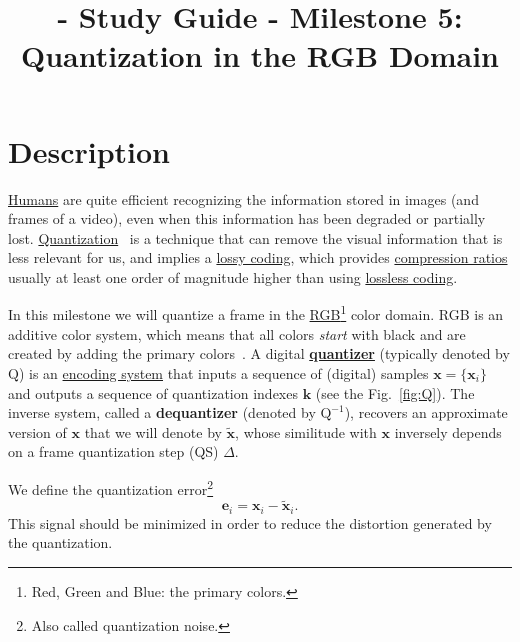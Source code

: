 
\title{\SM{} - Study Guide - Milestone 5: Quantization in the RGB Domain}

\maketitle

\tableofcontents

\section{Description}
\href{https://en.wikipedia.org/wiki/Visual_system}{Humans} are quite
efficient recognizing the information stored in images (and frames of
a video), even when this information has been degraded or partially
lost. \href{https://en.wikipedia.org/wiki/Quantization_(signal_processing)}{Quantization}~\cite{sayood2017introduction,vetterli2014foundations}
is a technique that can remove the visual information that is less
relevant for us, and implies a
\href{https://en.wikipedia.org/wiki/Lossy_compression}{lossy coding},
which provides
\href{https://en.wikipedia.org/wiki/Data_compression_ratio}{compression
  ratios} usually at least one order of magnitude higher than using
\href{https://en.wikipedia.org/wiki/Lossless_compression}{lossless
  coding}.

In this milestone we will quantize a frame in the
\href{https://en.wikipedia.org/wiki/RGB_color_model}{RGB\footnote{Red,
    Green and Blue: the primary colors.} color domain}. RGB is an
additive color system, which means that all colors \emph{start} with
black and are created by adding the primary
colors~\cite{burger2016digital}. A digital
\href{https://en.wikipedia.org/wiki/Quantization_(signal_processing)}{\textbf{quantizer}}
(typically denoted by $\text{Q}$) is an
\href{https://en.wikipedia.org/wiki/Data_compression}{encoding system}
that inputs a sequence of (digital) samples
${\mathbf x}=\{{\mathbf x}_i\}$ and outputs a sequence of quantization
indexes ${\mathbf k}$ (see the Fig.~\ref{fig:Q}). The inverse system,
called a \textbf{dequantizer} (denoted by $\text{Q}^{-1}$), recovers
an approximate version of ${\mathbf x}$ that we will denote by
$\tilde{{\mathbf x}}$, whose similitude with ${\mathbf x}$ inversely
depends on a frame quantization step (QS) $\Delta$. %

We define the quantization error\footnote{Also called quantization
noise.}
\begin{equation}
  {\mathbf e}_i = {\mathbf x}_i - \tilde{{\mathbf x}}_i.
\end{equation}
This signal should be minimized in order to reduce the distortion
generated by the quantization.

